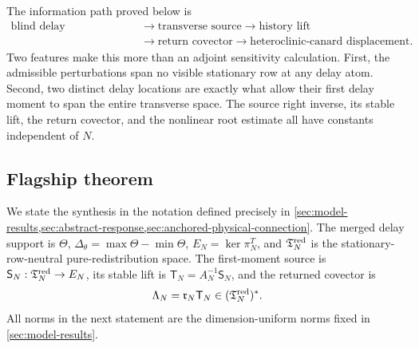 The information path proved below is
\begin{equation}
 \begin{aligned}
  \text{blind delay redistribution}
  &\longrightarrow \text{transverse source}
   \longrightarrow \text{history lift}\\
  &\longrightarrow \text{return covector}
   \longrightarrow \text{heteroclinic-canard displacement}.
 \end{aligned}                                      \label{eq:intro-return-chain}
\end{equation}
Two features make this more than an adjoint sensitivity calculation.  First,
the admissible perturbations span no visible stationary row at any delay
atom.  Second, two distinct delay locations are exactly what allow their
first delay moment to span the entire transverse space.  The source right
inverse, its stable lift, the return covector, and the nonlinear root estimate
all have constants independent of \(N\).

\subsection{Flagship theorem}

We state the synthesis in the notation defined precisely in
\cref{sec:model-results,sec:abstract-response,sec:anchored-physical-connection}.
The merged delay support is \(\Theta\),
\(\Delta_\theta=\max\Theta-\min\Theta\),
\(E_N=\ker\pi_N^T\), and \(\mathfrak T_N^{\rm red}\) is the
stationary-row-neutral pure-redistribution space.  The first-moment source is
\(\mathsf S_N:\mathfrak T_N^{\rm red}\to E_N\), its stable lift is
\(\mathsf T_N=A_N^{-1}\mathsf S_N\), and the returned covector is
\begin{equation}
 \Lambda_N=\mathfrak r_N\mathsf T_N
 \in(\mathfrak T_N^{\rm red})^*.                  \label{eq:intro-return-covector}
\end{equation}
All norms in the next statement are the dimension-uniform norms fixed in
\cref{sec:model-results}.

